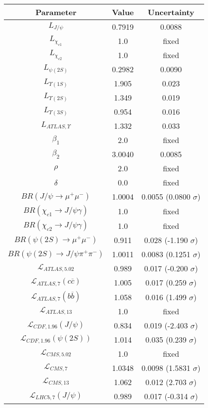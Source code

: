\begin{table}[h!]
\centering
\begin{tabular}{c|c|c}
Parameter & Value & Uncertainty \\
\hline
$L_{J/\psi}$ & 0.7919 & 0.0088 \\
$L_{\chi_{c1}}$ & 1.0 & fixed \\
$L_{\chi_{c2}}$ & 1.0 & fixed \\
$L_{\psi(2S)}$ & 0.2982 & 0.0090 \\
$L_{\Upsilon(1S)}$ & 1.905 & 0.023 \\
$L_{\Upsilon(2S)}$ & 1.349 & 0.019 \\
$L_{\Upsilon(3S)}$ & 0.954 & 0.016 \\
$L_{ATLAS,\Upsilon}$ & 1.332 & 0.033 \\
$\beta_1$ & 2.0 & fixed \\
$\beta_2$ & 3.0040 & 0.0085 \\
$\rho$ & 2.0 & fixed \\
$\delta$ & 0.0 & fixed \\
$BR(J/\psi\rightarrow\mu^+\mu^-)$ & 1.0004 & 0.0055 (0.0800 $\sigma$) \\
$BR(\chi_{c1}\rightarrow J/\psi\gamma)$ & 1.0 & fixed \\
$BR(\chi_{c2}\rightarrow J/\psi\gamma)$ & 1.0 & fixed \\
$BR(\psi(2S)\rightarrow\mu^+\mu^-)$ & 0.911 & 0.028 (-1.190 $\sigma$) \\
$BR(\psi(2S)\rightarrow J/\psi\pi^+\pi^-)$ & 1.0011 & 0.0083 (0.1251 $\sigma$) \\
$\mathcal L_{ATLAS,5.02}$ & 0.989 & 0.017 (-0.200 $\sigma$) \\
$\mathcal L_{ATLAS,7}(c\overline c)$ & 1.005 & 0.017 (0.259 $\sigma$) \\
$\mathcal L_{ATLAS,7}(b\overline b)$ & 1.058 & 0.016 (1.499 $\sigma$) \\
$\mathcal L_{ATLAS,13}$ & 1.0 & fixed \\
$\mathcal L_{CDF,1.96}(J/\psi)$ & 0.834 & 0.019 (-2.403 $\sigma$) \\
$\mathcal L_{CDF,1.96}(\psi(2S))$ & 1.014 & 0.035 (0.239 $\sigma$) \\
$\mathcal L_{CMS,5.02}$ & 1.0 & fixed \\
$\mathcal L_{CMS,7}$ & 1.0348 & 0.0098 (1.5831 $\sigma$) \\
$\mathcal L_{CMS,13}$ & 1.062 & 0.012 (2.703 $\sigma$) \\
$\mathcal L_{LHCb,7}(J/\psi)$ & 0.989 & 0.017 (-0.314 $\sigma$) \\

\end{tabular}
\end{table}
